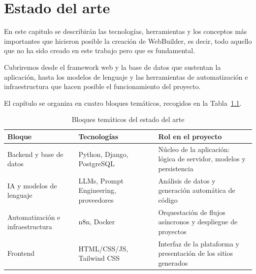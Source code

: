 
\cleardoublepage
\chapter{Estado del arte}
\label{chap:estado}

En este capitulo se describirán las tecnologías, herramientas y los conceptos más importantes que hicieron posible la creación de WebBuilder, es decir, todo aquello que no ha sido creado en este trabajo pero que es fundamental.

Cubriremos desde el framework web y la base de datos que sustentan la aplicación, hasta los modelos de lenguaje y las herramientas de automatización e infraestructura que hacen posible el funcionamiento del proyecto.

El capítulo se organiza en cuatro bloques temáticos, recogidos en la 
Tabla~\ref{tab:bloques-estado-arte}.

\begin{table}[H]
    \centering
    \begin{tabular}{|p{3.5cm}|p{4.5cm}|p{7cm}|}
        \hline
        \textbf{Bloque} & \textbf{Tecnologías} & \textbf{Rol en el proyecto} \\
        \hline
        Backend y base de datos & Python, Django, PostgreSQL & Núcleo de la aplicación: lógica de servidor, modelos y persistencia \\
        \hline
        IA y modelos de lenguaje & LLMs, Prompt Engineering, proveedores & Análisis de datos y generación automática de código \\
        \hline
        Automatización e infraestructura & n8n, Docker & Orquestación de flujos asíncronos y despliegue de proyectos \\
        \hline
        Frontend & HTML/CSS/JS, Tailwind CSS & Interfaz de la plataforma y presentación de los sitios generados \\
        \hline
    \end{tabular}
    \caption{Bloques temáticos del estado del arte}
    \label{tab:bloques-estado-arte}
\end{table}






